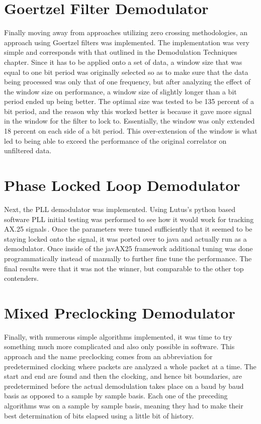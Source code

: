 \section{Goertzel Filter Demodulator}
Finally moving away from approaches utilizing zero crossing methodologies, an approach using Goertzel filters was implemented. The implementation was very simple and corresponds with that outlined in the Demodulation Techniques chapter. Since it has to be applied onto a set of data, a window size that was equal to one bit period was originally selected so as to make sure that the data being processed was only that of one frequency, but after analyzing the effect of the window size on performance, a window size of slightly longer than a bit period ended up being better. The optimal size was tested to be 135 percent of a bit period, and the reason why this worked better is because it gave more signal in the window for the filter to lock to. Essentially, the window was only extended 18 percent on each side of a bit period. This over-extension of the window is what led to being able to exceed the performance of the original correlator on unfiltered data.

\section{Phase Locked Loop Demodulator}
Next, the PLL demodulator was implemented. Using Lutus's python based software PLL initial testing was performed to see how it would work for tracking AX.25 signals\,\cite{Lutus2011}. Once the parameters were tuned sufficiently that it seemed to be staying locked onto the signal, it was ported over to java and actually run as a demodulator. Once inside of the javAX25 framework additional tuning was done programmatically instead of manually to further fine tune the performance. The final results were that it was not the winner, but comparable to the other top contenders.

\section{Mixed Preclocking Demodulator}
Finally, with numerous simple algorithms implemented, it was time to try something much more complicated and also only possible in software. This approach and the name preclocking comes from an abbreviation for predetermined clocking where packets are analyzed a whole packet at a time. The start and end are found and then the clocking, and hence bit boundaries, are predetermined before the actual demodulation takes place on a baud by baud basis as opposed to a sample by sample basis. Each one of the preceding algorithms was on a sample by sample basis, meaning they had to make their best determination of bits elapsed using a little bit of history.

